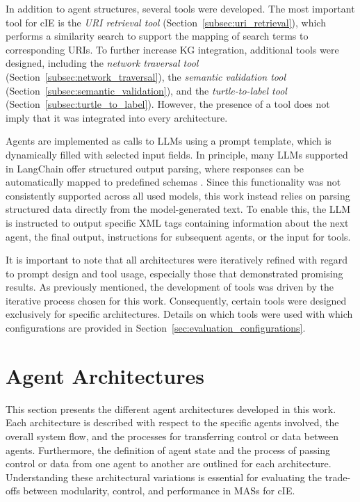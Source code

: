 \documentclass[a4paper,oneside,bibliography=totoc]{scrbook}
\begin{document}
In addition to agent structures, several tools were developed. The most important tool for \ac{cIE} is the \textit{\ac{URI} retrieval tool} (Section~\ref{subsec:uri_retrieval}), which performs a similarity search to support the mapping of search terms to corresponding \acp{URI}. To further increase \ac{KG} integration, additional tools were designed, including the \textit{network traversal tool} (Section~\ref{subsec:network_traversal}), the \textit{semantic validation tool} (Section~\ref{subsec:semantic_validation}), and the \textit{turtle-to-label tool} (Section~\ref{subsec:turtle_to_label}). However, the presence of a tool does not imply that it was integrated into every architecture.

Agents are implemented as calls to \acp{LLM} using a prompt template, which is dynamically filled with selected input fields. In principle, many \acp{LLM} supported in LangChain offer structured output parsing, where responses can be automatically mapped to predefined schemas \cite{LangChain2025e}. Since this functionality was not consistently supported across all used models, this work instead relies on parsing structured data directly from the model-generated text. To enable this, the \ac{LLM} is instructed to output specific XML tags containing information about the next agent, the final output, instructions for subsequent agents, or the input for tools.

It is important to note that all architectures were iteratively refined with regard to prompt design and tool usage, especially those that demonstrated promising results. As previously mentioned, the development of tools was driven by the iterative process chosen for this work. Consequently, certain tools were designed exclusively for specific architectures. Details on which tools were used with which configurations are provided in Section~\ref{sec:evaluation_configurations}.

\section{Agent Architectures}
\label{sec:agent_architectures}

This section presents the different agent architectures developed in this work. Each architecture is described with respect to the specific agents involved, the overall system flow, and the processes for transferring control or data between agents. Furthermore, the definition of agent state and the process of passing control or data from one agent to another are outlined for each architecture. Understanding these architectural variations is essential for evaluating the trade-offs between modularity, control, and performance in \acp{MAS} for \ac{cIE}.
\end{document}
